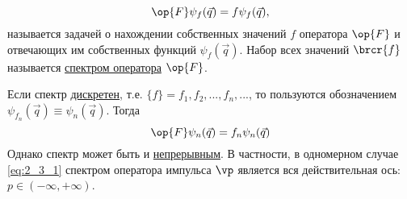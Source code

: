 \begin{equation}
\label{eq:2_3_2}
\op{F}\psi_f(\vec{q}) = f \psi_f(\vec{q}), 
\end{equation}%
%
называется задачей о нахождении собственных значений $f$ оператора $\op{F}$ и отвечающих им собственных функций $\psi_f(\vec{q})$. Набор всех значений $\brcr{f}$ называется \underline{спектром оператора} $\op{F}$.

Если спектр \underline{дискретен}, т.е. $\{f\} = f_1,f_2,...,f_n,... $, то пользуются обозначением $\psi_{f_n}(\vec{q}) \equiv \psi_n(\vec{q})$. Тогда%
%
\begin{equation}
\label{eq:2_3_3}
\op{F} \psi_n(\vec{q}) = f_n \psi_n(\vec{q})
\end{equation}%
%
Однако спектр может быть и \underline{непрерывным}. В частности, в одномерном случае \eqref{eq:2_3_1} спектром оператора импульса $\vp$ является вся действительная ось: $p \in (-\infty, +\infty)$.